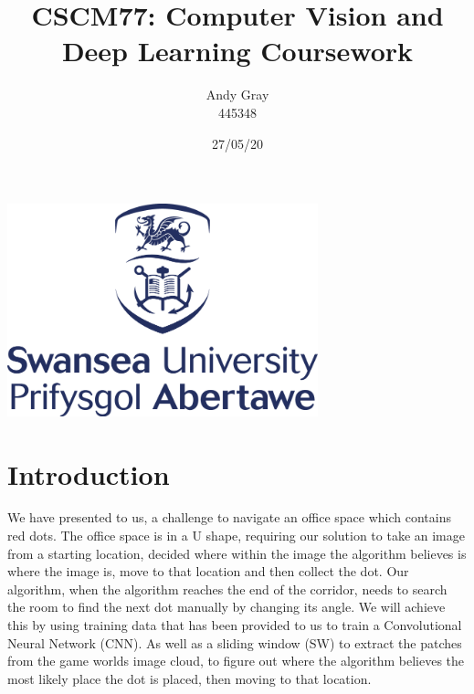 \documentclass[a4paper,10pt]{article}
\begin{document}
\title{\textbf{CSCM77: Computer Vision and Deep Learning Coursework}}
\date{27/05/20}
\author{Andy Gray\\445348}




\maketitle
\begin{center}
\item\includegraphics[width=9cm]{swansea.png}
\end{center}

\thispagestyle{empty}
\newpage
{}

\section{Introduction}

\small 
We have presented to us, a challenge to navigate an office space which contains red dots. The office space is in a U shape, requiring our solution to take an image from a starting location, decided where within the image the algorithm believes is where the image is, move to that location and then collect the dot. Our algorithm, when the algorithm reaches the end of the corridor, needs to search the room to find the next dot manually by changing its angle. We will achieve this by using training data that has been provided to us to train a Convolutional Neural Network (CNN). As well as a sliding window (SW) to extract the patches from the game worlds image cloud, to figure out where the algorithm believes the most likely place the dot is placed, then moving to that location.
\end{document}
